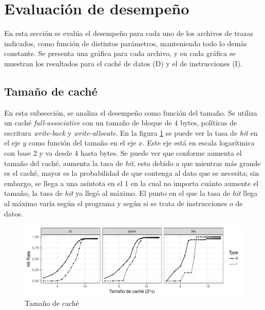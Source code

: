 \documentclass{article}
\begin{document}
\section{Evaluación de desempeño}


En esta sección se evalúa el desempeño para cada uno de los archivos de trazas indicados, como función de distintos parámetros, manteniendo todo lo demás constante. Se presenta una gráfica para cada archivo, y en cada gráfica se muestran los resultados para el caché de datos (D) y el de instrucciones (I).


\subsection{Tamaño de caché}


En esta subsección, se analiza el desempeño como función del tamaño. Se utiliza un caché \textit{full-associative} con un tamaño de bloque de 4 bytes, políticas de escritura \textit{write-back} y \textit{write-allocate}. En la figura \ref{fig:1_wsc} se puede ver la tasa de \textit{hit} en el eje $y$ como función del tamaño en el eje $x$. Este eje está en escala logarítmica con base 2 y va desde 4 hasta  bytes. Se puede ver que conforme aumenta el tamaño del caché, aumenta la tasa de \textit{hit}, esto debido a que mientras más grande es el caché, mayor es la probabilidad de que contenga al dato que se necesita; sin embargo, se llega a una asíntota en el 1 en la cual no importa cuánto aumente el tamaño, la tasa de \textit{hit} ya llegó al máximo. El punto en el que la tasa de \textit{hit} llega al máximo varía según el programa y según si se trata de instrucciones o de datos.

\begin{figure}[H]
    \centering
    \includegraphics[width=\textwidth]{1_wsc.pdf}
    \caption{Tamaño de caché}
    \label{fig:1_wsc}
\end{figure}
\end{document}
